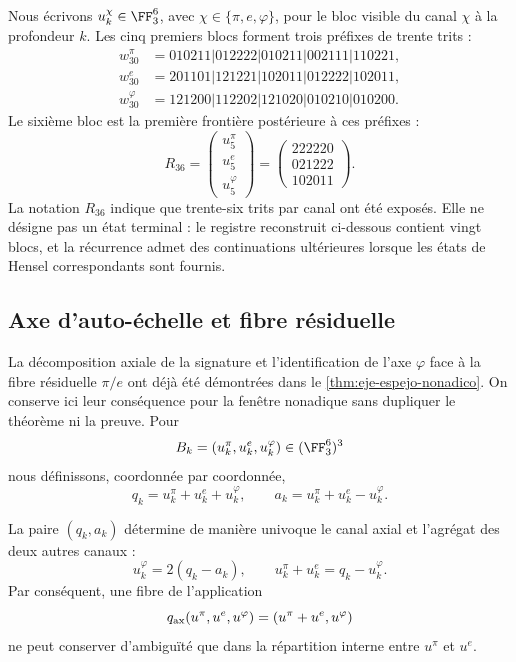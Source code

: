 Nous écrivons \(u_k^\chi\in\FF_3^6\), avec
\(\chi\in\{\pi,e,\varphi\}\), pour le bloc visible du canal \(\chi\) à la
profondeur \(k\). Les cinq premiers blocs forment trois préfixes de trente
trits :
\begin{align*}
w_{30}^{\pi}&=010211|012222|010211|002111|110221,\\
w_{30}^{e}&=201101|121221|102011|012222|102011,\\
w_{30}^{\varphi}&=121200|112202|121020|010210|010200.
\end{align*}
Le sixième bloc est la première frontière postérieure à ces préfixes :
\[
R_{36}=
\begin{pmatrix}
u_5^\pi\\ u_5^e\\ u_5^\varphi
\end{pmatrix}
=
\begin{pmatrix}
222220\\021222\\102011
\end{pmatrix}.
\]
La notation \(R_{36}\) indique que trente-six trits par
canal ont été exposés. Elle ne désigne pas un état terminal : le registre reconstruit ci-dessous
contient vingt blocs, et la récurrence admet des continuations ultérieures
lorsque les états de Hensel correspondants sont fournis.

\subsection{Axe d'auto-échelle et fibre résiduelle}

\ifdefined\HMTAxialTheoremDefined
La décomposition axiale de la signature et l'identification de l'axe
\(\varphi\) face à la fibre résiduelle \(\pi/e\) ont déjà été démontrées dans le
\cref{thm:eje-espejo-nonadico}. On conserve ici leur conséquence pour la
fenêtre nonadique sans dupliquer le théorème ni la preuve.
\else
Pour
\[
B_k=(u_k^\pi,u_k^e,u_k^\varphi)\in(\FF_3^6)^3
\]
nous définissons, coordonnée par coordonnée,
\[
q_k=u_k^\pi+u_k^e+u_k^\varphi,
\qquad
a_k=u_k^\pi+u_k^e-u_k^\varphi.
\]

\begin{theorem}
\label{thm:eje-espejo-nonadico}
La paire \((q_k,a_k)\) détermine de manière univoque le canal axial et l'agrégat des
deux autres canaux :
\[
u_k^\varphi=2(q_k-a_k),
\qquad
u_k^\pi+u_k^e=q_k-u_k^\varphi.
\]
Par conséquent, une fibre de l'application
\[
q_{\rm ax}(u^\pi,u^e,u^\varphi)
=(u^\pi+u^e,u^\varphi)
\]
ne peut conserver d'ambiguïté que dans la répartition interne entre \(u^\pi\) et
\(u^e\).
\end{theorem}

